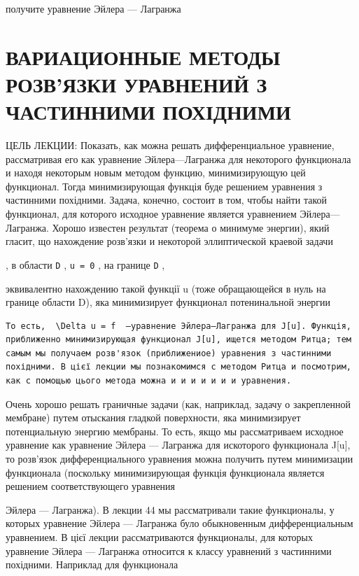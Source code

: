 \documentclass[
  ukrainian,
]{article}
\begin{document}
получите уравнение Эйлера --- Лагранжа

\section{ВАРИАЦИОННЫЕ МЕТОДЫ РОЗВ'ЯЗКИ УРАВНЕНИЙ З ЧАСТИННИМИ
ПОХІДНИМИ}\label{ux432ux430ux440ux438ux430ux446ux438ux43eux43dux43dux44bux435-ux43cux435ux442ux43eux434ux44b-ux440ux43eux437ux432ux44fux437ux43aux438-ux443ux440ux430ux432ux43dux435ux43dux438ux439-ux437-ux447ux430ux441ux442ux438ux43dux43dux438ux43cux438-ux43fux43eux445ux456ux434ux43dux438ux43cux438}

ЦЕЛЬ ЛЕКЦИИ: Показать, как можна решать дифференциальное уравнение,
рассматривая его как уравнение Эйлера---Лагранжа для некоторого
функционала и находя некоторым новым методом функцию, минимизирующую цей
функционал. Тогда минимизирующая функція буде решением уравнения з
частинними похідними. Задача, конечно, состоит в том, чтобы найти такой
функционал, для которого исходное уравнение является уравнением
Эйлера---Лагранжа. Хорошо известен результат (теорема о минимуме
энергии), який гласит, що нахождение розв'язки и некоторой эллиптической
краевой задачи

, в области \texttt{D} , \texttt{u\ =\ 0} , на границе \texttt{D} ,

эквивалентно нахождению такой функції u (тоже обращающейся в нуль на
границе области D), яка минимизирует функционал потенинальной энергии

\begin{verbatim}
То есть,  \Delta u = f  —уравнение Эйлера—Лагранжа для J[u]. Функція, приближенно минимизирующая функционал J[u], ищется методом Ритца; тем самым мы получаем розв'язок (приближениое) уравнения з частинними похідними. В цієї лекции мы познакомимся с методом Ритца и посмотрим, как с помощью цього метода можна и и и и и и и уравнения.
\end{verbatim}

Очень хорошо решать граничные задачи (как, наприклад, задачу о
закрепленной мембране) путем отыскания гладкой поверхности, яка
минимизирует потенциальную энергию мембраны. То есть, якщо мы
рассматриваем исходное уравнение как уравнение Эйлера --- Лагранжа для
искоторого функционала J{[}u{]}, то розв'язок дифференциального
уравнения можна получить путем минимизации функционала (поскольку
минимизирующая функція функционала является решением соответствующего
уравнения

Эйлера --- Лагранжа). В лекции 44 мы рассматривали такие функционалы, у
которых уравнение Эйлера --- Лагранжа було обыкновенным дифференциальным
уравнением. В цієї лекции рассматриваются функционалы, для которых
уравнение Эйлера --- Лагранжа относится к классу уравнений з частинними
похідними. Наприклад для функционала
\end{document}
